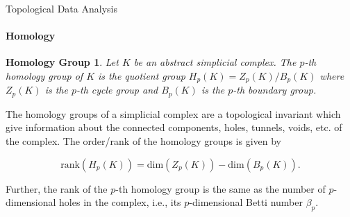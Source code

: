 \documentclass[pdf]{beamer}
\begin{document}
    \begin{frame}{Topological Data Analysis}
        \framesubtitle{Homology}
        \newtheorem{defn:homology}{Homology Group}

        \begin{defn:homology}
            Let $K$ be an abstract simplicial complex. The {\color{red} $p$-th homology group} of $K$ is the quotient 
            group $H_p(K) = Z_p(K) / B_p(K)$ where $Z_p(K)$ is the $p$-th cycle group and $B_p(K)$ is the $p$-th 
            boundary group.
        \end{defn:homology}

        The homology groups of a simplicial complex are a topological invariant which give information about the 
        connected components, holes, tunnels, voids, etc. of the complex. The order/rank of the homology groups
        is given by 

        \begin{equation*}
            \text{rank}(H_p(K)) = \text{dim}(Z_p(K)) - \text{dim}(B_p(K)).
        \end{equation*}

        Further, the rank of the $p$-th homology group is the same as the number of $p$-dimensional holes in the complex, i.e., its $p$-dimensional {\color{red} Betti number} $\beta_p$.
    \end{frame}
\end{document}
